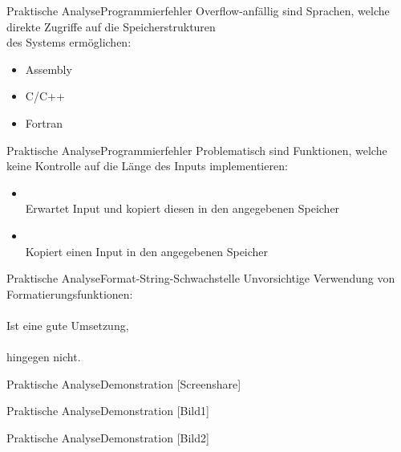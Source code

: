 \begin{frame}{Praktische Analyse}{Programmierfehler}
    Overflow-anfällig sind Sprachen, welche direkte Zugriffe auf die Speicherstrukturen\\ des Systems ermöglichen:
    \begin{itemize}
        \vspace{1em}
        \item Assembly
        \item C/C++
        \item Fortran
    \end{itemize}
\end{frame}

\begin{frame}{Praktische Analyse}{Programmierfehler}
    Problematisch sind Funktionen, welche
    keine Kontrolle auf die Länge des Inputs implementieren: %
    \begin{itemize}
        \vspace{1em}
        \item {}\\ Erwartet Input und kopiert diesen in den angegebenen Speicher
        \vspace{1em}
        \item {}\\ Kopiert einen Input
        in den angegebenen Speicher
    \end{itemize}
\end{frame}


\begin{frame}{Praktische Analyse}{Format-String-Schwachstelle}
    Unvorsichtige Verwendung von Formatierungsfunktionen:\\ %
    \\ Ist eine gute Umsetzung,\\
    \\ hingegen nicht.
\end{frame}


\begin{frame}{Praktische Analyse}{Demonstration}
    [Screenshare]
\end{frame}

\begin{frame}{Praktische Analyse}{Demonstration}
    [Bild1]
\end{frame}

\begin{frame}{Praktische Analyse}{Demonstration}
    [Bild2]
\end{frame}

